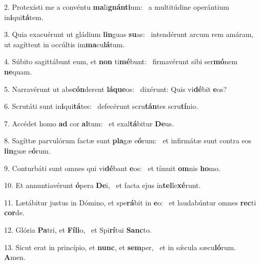 2. Protexísti me a convéntu \textbf{ma}li\textbf{gnán}\textbf{ti}um: \ast\  a multitúdine operántium in\textbf{i}qui\textbf{tá}tem.\

3. Quia exacuérunt ut gládium \textbf{lin}guas \textbf{su}as: \ast\  intendérunt arcum rem amáram, ut sagíttent in occúltis im\textbf{ma}cu\textbf{lá}tum.\

4. Súbito sagittábunt eum, et \textbf{non} ti\textbf{mé}bunt: \ast\  firmavérunt sibi ser\textbf{mó}nem \textbf{ne}quam.\

5. Narravérunt ut abs\textbf{cón}derent \textbf{lá}\textbf{que}os: \ast\  dixérunt: Quis vi\textbf{dé}bit \textbf{e}os?\

6. Scrutáti sunt in\textbf{i}qui\textbf{tá}tes: \ast\  defecérunt scru\textbf{tán}tes scru\textbf{tí}nio.\

7. Accédet homo \textbf{ad} cor \textbf{al}tum: \ast\  et exal\textbf{tá}bitur \textbf{De}us.\

8. Sagíttæ parvulórum factæ sunt \textbf{pla}gæ e\textbf{ó}rum: \ast\  et infirmátæ sunt contra eos \textbf{lin}guæ e\textbf{ó}rum.\

9. Conturbáti sunt omnes qui vi\textbf{dé}bant \textbf{e}os: \ast\  et tímuit \textbf{om}nis \textbf{ho}mo.\

10. Et annuntiavérunt \textbf{ó}pera \textbf{De}i, \ast\  et facta ejus in\textbf{tel}le\textbf{xé}runt.\

11. Lætábitur justus in Dómino, et spe\textbf{rá}bit in \textbf{e}o: \ast\  et laudabúntur omnes \textbf{rec}ti \textbf{cor}de.\

12. Glória \textbf{Pa}tri, et \textbf{Fí}\textbf{li}o, \ast\  et Spi\textbf{rí}tui \textbf{Sanc}to.\

13. Sicut erat in princípio, et \textbf{nunc}, et \textbf{sem}per, \ast\  et in sǽcula sæcu\textbf{ló}rum. \textbf{A}men.\

